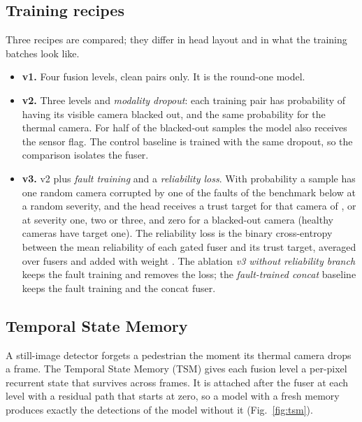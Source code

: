 \subsection{Training recipes}
\label{sec:recipes}
Three recipes are compared; they differ in head layout and in what the training batches look like.
\begin{itemize}
\item \textbf{v1.} Four fusion levels, clean pairs only. It is the round-one model.
\item \textbf{v2.} Three levels and \emph{modality dropout}: each training pair has probability \cfgMdProb{} of having its visible camera blacked out, and the same probability for the thermal camera. For half of the blacked-out samples the model also receives the sensor flag. The control baseline is trained with the same dropout, so the comparison isolates the fuser.
\item \textbf{v3.} v2 plus \emph{fault training} and a \emph{reliability loss}. With probability \cfgFaultProb{} a sample has one random camera corrupted by one of the faults of the benchmark below at a random severity, and the head receives a trust target for that camera of \cfgTrustOne{}, \cfgTrustTwo{} or \cfgTrustThree{} at severity one, two or three, and zero for a blacked-out camera (healthy cameras have target one). The reliability loss is the binary cross-entropy between the mean reliability of each gated fuser and its trust target, averaged over fusers and added with weight \cfgRelWeight{}. The ablation \emph{v3 without reliability branch} keeps the fault training and removes the loss; the \emph{fault-trained concat} baseline keeps the fault training and the concat fuser.
\end{itemize}

\subsection{Temporal State Memory}
\label{sec:tsm}
A still-image detector forgets a pedestrian the moment its thermal camera drops a frame. The Temporal State Memory (TSM) gives each fusion level a per-pixel recurrent state that survives across frames. It is attached after the fuser at each level with a residual path that starts at zero, so a model with a fresh memory produces exactly the detections of the model without it (Fig.~\ref{fig:tsm}).

